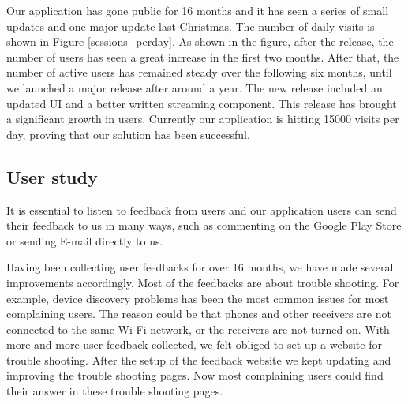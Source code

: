 Our application has gone public for 16 months and it has seen a series of small
updates and one major update last Christmas. The number of daily visits is
shown in Figure \ref{sessions_perday}. As shown in the figure, after the
release, the number of users has seen a great increase in the first two months.
After that, the number of active users has remained steady over the following
six months, until we launched a major release after around a year. The new
release included an updated UI and a better written streaming component. This
release has brought a significant growth in users. Currently our application is
hitting 15000 visits per day,  proving that our solution has been successful.

\subsection{User study\label{4_3}}
It is essential to listen to feedback from users and our application users can
send their feedback to us in many ways, such as commenting on the Google Play
Store or sending E-mail directly to us.

Having been collecting user feedbacks for over 16 months, we have made several
improvements accordingly. Most of the feedbacks are about trouble shooting. For
example, device discovery problems has been the most common issues for most
complaining users. The reason could be that phones and other receivers are not
connected to the same Wi-Fi network, or the receivers are not turned on. With
more and more user feedback collected, we felt obliged to set up a website for
trouble shooting. After the setup of the feedback website we kept updating and
improving the trouble shooting pages. Now most complaining users could find
their answer in these trouble shooting pages.
